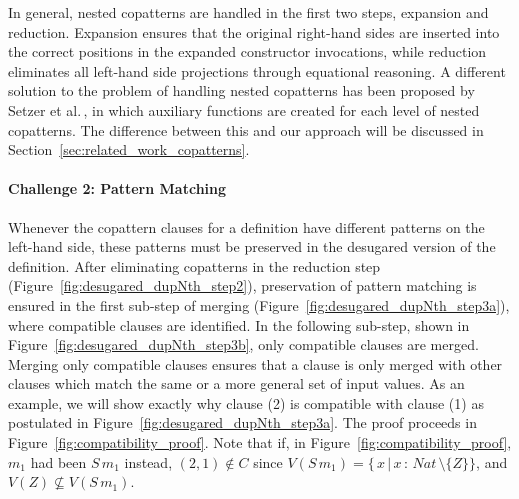 In general, nested copatterns are handled in the first two steps, expansion and
reduction. Expansion ensures that the original right-hand sides are inserted
into the correct positions in the expanded constructor invocations, while
reduction eliminates all left-hand side projections through equational
reasoning. A different solution to the problem of handling nested copatterns has
been proposed by Setzer et al.\,\citep{Setzer14Unnesting}, in which auxiliary
functions are created for each level of nested copatterns. The difference
between this and our approach will be discussed in Section~\ref{sec:related_work_copatterns}.

\paragraph{Challenge 2: Pattern Matching}
Whenever the copattern clauses for a definition have different patterns on the
left-hand side, these patterns must be preserved in the desugared version of the
definition. After eliminating copatterns in the reduction step
(Figure~\ref{fig:desugared_dupNth_step2}), preservation of pattern matching is
ensured in the first sub-step of merging
(Figure~\ref{fig:desugared_dupNth_step3a}), where compatible clauses are
identified. In the following sub-step, shown in
Figure~\ref{fig:desugared_dupNth_step3b}, only compatible clauses are
merged. Merging only compatible clauses ensures that a clause is only merged
with other clauses which match the same or a more general set of input values. As an example, we will show exactly why clause (2) is compatible
with clause (1) as postulated in
Figure~\ref{fig:desugared_dupNth_step3a}. The proof
proceeds in Figure~\ref{fig:compatibility_proof}. Note that if, in Figure~\ref{fig:compatibility_proof}, $m_{1}$ had been
$S\,m_{1}$ instead, $(2,1)\notin C$ since $V(S\,m_{1}) =
\{\,x\,|\,x\,:\,Nat\,\setminus\{Z\}\}$, and $V(Z)\not\subseteq V(S\,m_{1})$.

